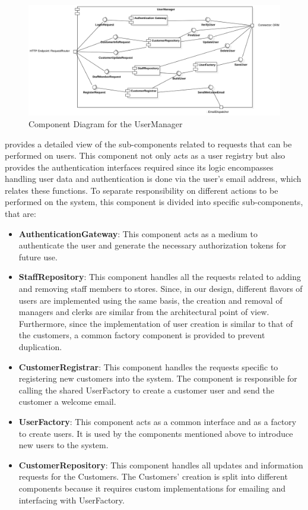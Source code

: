 \begin{figure}[H]
    \centering
    \includegraphics[height=0.4\textwidth]{Images/ComponentDiagrams/UserManager.png}
    \caption{Component Diagram for the UserManager}
    \label{fig:CDUserManager}
\end{figure}
 provides a detailed view of the sub-components related to requests that can be performed on users.
This component not only acts as a user registry but also provides the authentication interfaces required since its logic encompasses handling user data and authentication is done via the user's email address, which relates these functions.
To separate responsibility on different actions to be performed on the system, this component is divided into specific sub-components, that are:
\begin{itemize}
    \item \textbf{AuthenticationGateway}: This component acts as a medium to authenticate the user and generate the necessary authorization tokens for future use.
    \item \textbf{StaffRepository}: This component handles all the requests related to adding and removing staff members to stores.
    Since, in our design, different flavors of users are implemented using the same basis, the creation and removal of managers and clerks are similar from the architectural point of view.
    Furthermore, since the implementation of user creation is similar to that of the customers, a common factory component is provided to prevent duplication.
    \item \textbf{CustomerRegistrar}: This component handles the requests specific to registering new customers into the system.
    The component is responsible for calling the shared UserFactory to create a customer user and send the customer a welcome email.
    \item \textbf{UserFactory}: This component acts as a common interface and as a factory to create users.
    It is used by the components mentioned above to introduce new users to the system.
    \item \textbf{CustomerRepository}: This component handles all updates and information requests for the Customers.
    The Customers' creation is split into different components because it requires custom implementations for emailing and interfacing with UserFactory.
\end{itemize}
